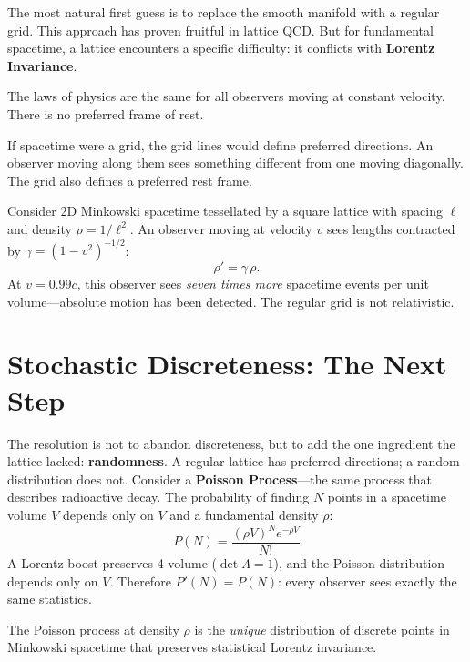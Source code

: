 \documentclass[11pt, a4paper, openany]{book}
\newcounter{thm}[chapter]
\begin{document}
\noindent
The most natural first guess is to replace the smooth manifold with a
regular grid. This approach has proven fruitful in lattice QCD. But for
fundamental spacetime, a lattice encounters a specific difficulty: it
conflicts with \textbf{Lorentz Invariance}.

\begin{definition}
The laws of physics are the same for all observers moving at constant
velocity. There is no preferred frame of rest.
\end{definition}

\noindent
If spacetime were a grid, the grid lines would define preferred
directions. An observer moving along them sees something different from
one moving diagonally. The grid also defines a preferred rest frame.

Consider 2D Minkowski spacetime tessellated by a square lattice with
spacing $\ell$ and density $\rho = 1/\ell^2$. An observer moving at
velocity $v$ sees lengths contracted by $\gamma = (1 - v^2)^{-1/2}$:
\[
  \rho' = \gamma\,\rho.
\]
At $v = 0.99c$, this observer sees \emph{seven times more} spacetime
events per unit volume---absolute motion has been detected. The regular
grid is not relativistic.

\section{Stochastic Discreteness: The Next Step}

The resolution is not to abandon discreteness, but to add the one
ingredient the lattice lacked: \textbf{randomness}. A regular lattice has
preferred directions; a random distribution does not. Consider a
\textbf{Poisson Process}---the same process that describes radioactive
decay. The probability of finding $N$ points in a spacetime volume $V$
depends only on $V$ and a fundamental density $\rho$:
\begin{equation}
  P(N) = \frac{(\rho V)^N e^{-\rho V}}{N!}
\end{equation}
A Lorentz boost preserves 4-volume ($\det\Lambda = 1$), and the Poisson
distribution depends only on $V$. Therefore $P'(N) = P(N)$: every
observer sees exactly the same statistics.

\begin{theorem}\label{thm:bhs}
The Poisson process at density $\rho$ is the \emph{unique} distribution
of discrete points in Minkowski spacetime that preserves statistical
Lorentz invariance.
\end{theorem}
\end{document}
